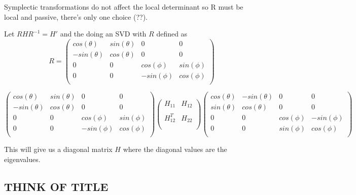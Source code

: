 \documentclass[11pt,a4paper]{article}
\numberwithin{equation}{section}
\begin{document}
	Symplectic transformations do not affect the local determinant so R must be local and passive, there's only one choice (??).
	
	Let $RHR^{-1} = H'$ and the doing an SVD with $R$ defined as
	\begin{equation*}
	R = \begin{pmatrix}
	cos(\theta) & sin(\theta) & 0 & 0\\
	-sin(\theta) & cos(\theta) & 0 & 0\\
	0 & 0 & cos(\phi) & sin(\phi) \\
	0 & 0 & -sin(\phi) & cos(\phi)\\
	\end{pmatrix}
	\end{equation*}

	\begin{equation*}
	\begin{pmatrix}
	cos(\theta) & sin(\theta) & 0 & 0\\
	-sin(\theta) & cos(\theta) & 0 & 0\\
	0 & 0 & cos(\phi) & sin(\phi) \\
	0 & 0 & -sin(\phi) & cos(\phi)\\
	\end{pmatrix}	\begin{pmatrix}
	H_{11} & H_{12}\\
	\\
	H^{T}_{12} & H_{22} \\
	\\
	\end{pmatrix}	\begin{pmatrix}
	cos(\theta) & -sin(\theta) & 0 & 0\\
	sin(\theta) & cos(\theta) & 0 & 0\\
	0 & 0 & cos(\phi) & -sin(\phi) \\
	0 & 0 & sin(\phi) & cos(\phi)\\
	\end{pmatrix}
	\end{equation*}	
	
	This will give us a diagonal matrix $H$ where the diagonal values are the eigenvalues. 
	\fi
	
	\subsection{THINK OF TITLE}
\end{document}
